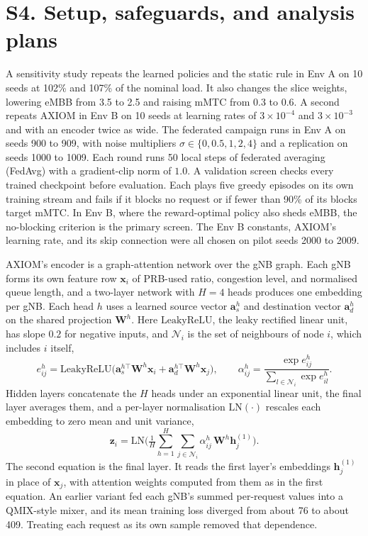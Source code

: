 \documentclass[9pt]{extarticle}
\begin{document}
\section*{S4. Setup, safeguards, and analysis plans}
A sensitivity study repeats the learned policies and the static rule in Env A on 10 seeds at 102\% and 107\% of the nominal load. It also changes the slice weights, lowering eMBB from 3.5 to 2.5 and raising mMTC from 0.3 to 0.6. A second repeats AXIOM in Env B on 10 seeds at learning rates of $3{\times}10^{-4}$ and $3{\times}10^{-3}$ and with an encoder twice as wide. The federated campaign runs in Env A on seeds 900 to 909, with noise multipliers $\sigma \in \{0, 0.5, 1, 2, 4\}$ and a replication on seeds 1000 to 1009. Each round runs 50 local steps of federated averaging (FedAvg) with a gradient-clip norm of $1.0$. A validation screen checks every trained checkpoint before evaluation. Each plays five greedy episodes on its own training stream and fails if it blocks no request or if fewer than 90\% of its blocks target mMTC. In Env B, where the reward-optimal policy also sheds eMBB, the no-blocking criterion is the primary screen. The Env B constants, AXIOM's learning rate, and its skip connection were all chosen on pilot seeds 2000 to 2009.

AXIOM's encoder is a graph-attention network over the gNB graph. Each gNB forms its own feature row $\mathbf{x}_i$ of PRB-used ratio, congestion level, and normalised queue length, and a two-layer network with $H{=}4$ heads produces one embedding per gNB. Each head $h$ uses a learned source vector $\mathbf{a}_s^{h}$ and destination vector $\mathbf{a}_d^{h}$ on the shared projection $\mathbf{W}^{h}$. Here $\mathrm{LeakyReLU}$, the leaky rectified linear unit, has slope $0.2$ for negative inputs, and $\mathcal{N}_i$ is the set of neighbours of node $i$, which includes $i$ itself,
\begin{equation}
e_{ij}^{h}=\mathrm{LeakyReLU}\big(\mathbf{a}_s^{h\top} \mathbf{W}^{h} \mathbf{x}_i + \mathbf{a}_d^{h\top} \mathbf{W}^{h} \mathbf{x}_j\big),
\qquad
\alpha_{ij}^{h}=\frac{\exp e_{ij}^{h}}{\sum_{l\in\mathcal{N}_i}\exp e_{il}^{h}}.
\end{equation}
Hidden layers concatenate the $H$ heads under an exponential linear unit, the final layer averages them, and a per-layer normalisation $\mathrm{LN}(\cdot)$ rescales each embedding to zero mean and unit variance,
\begin{equation}
\mathbf{z}_i=\mathrm{LN}\!\Big(\tfrac{1}{H}\textstyle\sum_{h=1}^{H}\sum_{j\in\mathcal{N}_i}\alpha_{ij}^{h}\,\mathbf{W}^{h} \mathbf{h}_j^{(1)}\Big).
\end{equation}
The second equation is the final layer. It reads the first layer's embeddings $\mathbf{h}_j^{(1)}$ in place of $\mathbf{x}_j$, with attention weights computed from them as in the first equation.
An earlier variant fed each gNB's summed per-request values into a QMIX-style mixer, and its mean training loss diverged from about 76 to about 409. Treating each request as its own sample removed that dependence.
\end{document}

